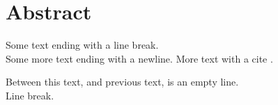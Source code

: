 \section{Abstract}
Some text ending with a line break.\\
Some more text ending with a newline.
\newline
More text with a cite \cite[p.~38]{DBLP:conf/tgc/MontesiS10}.

Between this text, and previous text, is an empty line.\\
Line break.
\newpage